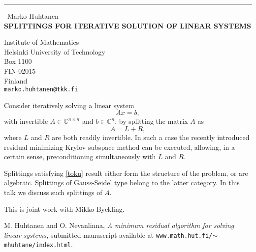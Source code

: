 \documentclass{report}
\begin{document}
\begin{center}
\rule{6in}{1pt} \
{\large Marko Huhtanen \\
{\bf SPLITTINGS FOR ITERATIVE SOLUTION OF LINEAR SYSTEMS}}

Institute of Mathematics \\ Helsinki University of Technology \\ Box 1100 \\ FIN-02015 \\ Finland
\\
{\tt marko.huhtanen@tkk.fi}\end{center}

\def\setC{\mathbb{C}}

Consider iteratively solving
a linear system
\begin{equation}\label{eku}
Ax=b,
\end{equation}
with invertible $A\in \setC^{n \times n}$ and $b\in \setC^n$,
by splitting the matrix $A$ as
\begin{equation}\label{toku}
A=L+R,
\end{equation}
where $L$ and $R$ are both readily invertible.
In such a case the recently introduced residual minimizing
Krylov subspace method \cite{HN} can be executed, allowing,
in a certain sense, preconditioning simultaneously with $L$ and $R$.

Splittings satisfying \eqref{toku} result either form
the structure of the problem, or are algebraic.
Splittings of Gauss-Seidel type belong to the latter category.
In this talk we discuss such splittings of $A$.

\medskip
This is joint work with Mikko Byckling.

\begin{thebibliography}{1}
 {\sc M. Huhtanen and O. Nevanlinna}, {\em A minimum residual
algorithm for solving linear systems,} submitted manuscript available at
\texttt{www.math.hut.fi/$\sim$mhuhtane/index.html}.
\end{thebibliography}
\end{document}
